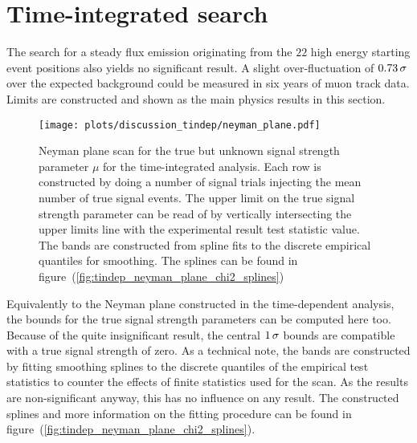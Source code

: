 \section*{Time-integrated search}
The search for a steady flux emission originating from the $\num{22}$ high energy starting event positions also yields no significant result.
A slight over-fluctuation of $\num{0.73}\,\sigma$ over the expected background could be measured in six years of muon track data.
Limits are constructed and shown as the main physics results in this section.

\begin{figure}[htpb]
  \centering
  \texttt{[image: plots/discussion\_tindep/neyman\_plane.pdf]}
  \caption[Neyman plane for the signal strength parameter in the time-integrated analysis]{
    Neyman plane scan for the true but unknown signal strength parameter $\mu$ for the time-integrated analysis.
    Each row is constructed by doing a number of signal trials injecting the mean number of true signal events.
    The upper limit on the true signal strength parameter can be read of by vertically intersecting the upper limits line with the experimental result test statistic value.
    The bands are constructed from spline fits to the discrete empirical quantiles for smoothing.
    The splines can be found in figure~(\ref{fig:tindep_neyman_plane_chi2_splines})
  }
  \label{fig:tdep_neyman_plane}
\end{figure}

Equivalently to the Neyman plane constructed in the time-dependent analysis, the bounds for the true signal strength parameters can be computed here too.
Because of the quite insignificant result, the central $\num{1}\,\sigma$ bounds are compatible with a true signal strength of zero.
As a technical note, the bands are constructed by fitting smoothing splines to the discrete quantiles of the empirical test statistics to counter the effects of finite statistics used for the scan.
As the results are non-significant anyway, this has no influence on any result.
The constructed splines and more information on the fitting procedure can be found in figure~(\ref{fig:tindep_neyman_plane_chi2_splines}).

